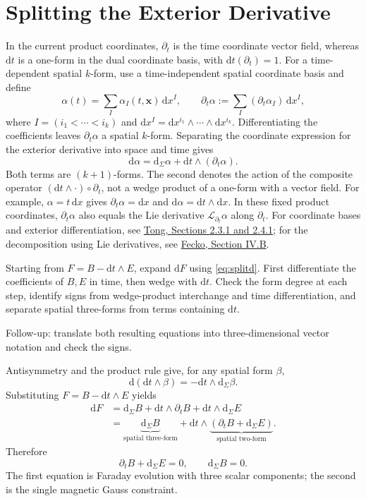 \documentclass[11pt,openany]{book}
\numberwithin{equation}{chapter}
\theoremstyle{definition}
\theoremstyle{remark}
\newcommand{\dd}{\mathrm d}
\begin{document}
\section{Splitting the Exterior Derivative}
In the current product coordinates, $\partial_t$ is the time coordinate vector field,
whereas $\dd t$ is a one-form in the dual coordinate basis, with $\dd t(\partial_t)=1$.
For a time-dependent spatial $k$-form, use a time-independent spatial coordinate basis and define
\[
\alpha(t)=\sum_I\alpha_I(t,\bm x)\,\dd x^I,\qquad
\partial_t\alpha:=\sum_I(\partial_t\alpha_I)\,\dd x^I,
\]
where $I=(i_1<\cdots<i_k)$ and $\dd x^I=\dd x^{i_1}\wedge\cdots\wedge\dd x^{i_k}$.
Differentiating the coefficients leaves $\partial_t\alpha$ a spatial $k$-form.
Separating the coordinate expression for the exterior derivative into space and time gives
\begin{equation}\label{eq:splitd}
\dd\alpha=\dd_\Sigma\alpha+\dd t\wedge(\partial_t\alpha).
\end{equation}
Both terms are $(k+1)$-forms. The second denotes the action of the composite operator
$(\dd t\wedge\cdot)\circ\partial_t$, not a wedge product of a one-form with a vector field.
For example, $\alpha=t\,\dd x$ gives $\partial_t\alpha=\dd x$ and
$\dd\alpha=\dd t\wedge\dd x$.
In these fixed product coordinates, $\partial_t\alpha$ also equals the
Lie derivative $\mathcal L_{\partial_t}\alpha$ along $\partial_t$.
For coordinate bases and exterior differentiation, see
\href{https://www.davidtong.org/teaching/general-relativity/grhtml/S2}{Tong, Sections 2.3.1 and 2.4.1};
for the decomposition using Lie derivatives, see
\href{https://arxiv.org/abs/gr-qc/9701066}{Fecko, Section IV.B}.

\begin{askai}
Starting from $F=B-\dd t\wedge E$, expand $\dd F$ using \eqref{eq:splitd}.
First differentiate the coefficients of $B,E$ in time, then wedge with $\dd t$.
Check the form degree at each step, identify signs from wedge-product interchange
and time differentiation, and separate spatial three-forms from terms containing $\dd t$.

Follow-up: translate both resulting equations into three-dimensional vector notation and check the signs.
\end{askai}
Antisymmetry and the product rule give, for any spatial form $\beta$,
\begin{equation}
\dd(\dd t\wedge\beta)=-\dd t\wedge\dd_\Sigma\beta.
\end{equation}
Substituting $F=B-\dd t\wedge E$ yields
\begin{align}
\dd F
 &=\dd_\Sigma B+\dd t\wedge\partial_tB
   +\dd t\wedge\dd_\Sigma E\\
 &=\underbrace{\dd_\Sigma B}_{\text{spatial three-form}}
  +\dd t\wedge\underbrace{(\partial_tB+\dd_\Sigma E)}_{\text{spatial two-form}}.
\end{align}
Therefore
\begin{equation}\label{eq:splitFaraday}
\boxed{\partial_tB+\dd_\Sigma E=0,\qquad \dd_\Sigma B=0.}
\end{equation}
The first equation is Faraday evolution with three scalar components; the second is the single magnetic Gauss constraint.
\end{document}
